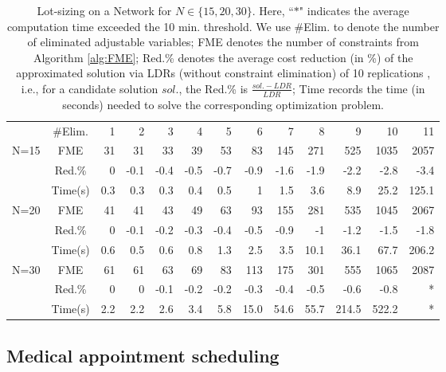 \documentclass[fleqn,orsc,blindrev]{informs4}
\begin{document}
\begin{table*}[t]
			\centering
			\caption{Lot-sizing on a Network for $N\in \{15,20,30\}$. Here, ``$*$" indicates the average computation time exceeded the 10 min. threshold. We use \#Elim. to denote the number of eliminated adjustable variables; FME denotes the number of constraints from Algorithm \ref{alg:FME}; Red.\% denotes the average cost reduction (in \%) of the approximated solution via LDRs (without constraint elimination) of 10 replications , i.e., for a candidate solution $sol.$, the Red.\% is $\frac{sol. - LDR}{LDR}$; Time records the time (in seconds) needed to solve the corresponding optimization problem.}
\def\arraystretch{1.3}			\begin{tabular}{cc|rrrrrrrrrrr}
				\cline{2-13}
				& \#Elim. & 1     & 2     & 3     & 4     & 5     & 6     & 7     & 8     & 9     & 10    & 11 \\ \cline{2-13}
				\multirow{3}{*}{N=15} &  FME  & 31     & 31  & 33     & 39     & 53     & 83     & 145     & 271     & 525     & 1035    & 2057   \\ 
				 & Red.\% & 0     & -0.1  & -0.4  & -0.5  & -0.7  & -0.9  & -1.6  & -1.9  & -2.2  & -2.8  & -3.4 \\
				& Time(s)  & 0.3   & 0.3   & 0.3   & 0.4   & 0.5   & 1     & 1.5   & 3.6   & 8.9   & 25.2  & 125.1 \\ \cline{2-13}
			\multirow{3}{*}{N=20} &  FME  & 41     & 41  & 43     & 49     & 63     & 93     & 155     & 281     & 535     & 1045    & 2067   \\ 
				 & Red.\% & 0     & -0.1  & -0.2  & -0.3  & -0.4  & -0.5  & -0.9  & -1    & -1.2  & -1.5  & -1.8 \\
				& Time(s)  & 0.6   & 0.5   & 0.6   & 0.8   & 1.3   & 2.5   & 3.5   & 10.1  & 36.1  & 67.7  & 206.2 \\ \cline{2-13}
			\multirow{3}{*}{N=30} &  FME  & 61     & 61  & 63     & 69     & 83     & 113     & 175     & 301     & 555     & 1065    & 2087   \\
				 & Red.\% & 0     & 0     & -0.1  & -0.2  & -0.2  & -0.3  & -0.4  & -0.5  & -0.6  & -0.8  & * \\
				& Time(s)  & 2.2   & 2.2   & 2.6   & 3.4   & 5.8   & 15.0  & 54.6  & 55.7  & 214.5 & 522.2   & * \\ \cline{2-13}
			\end{tabular}%
			\label{tab:lsonb}%
		\end{table*}%
		
		
		\subsection{Medical appointment scheduling} \label{sec:asproblem}
		
\end{document}
